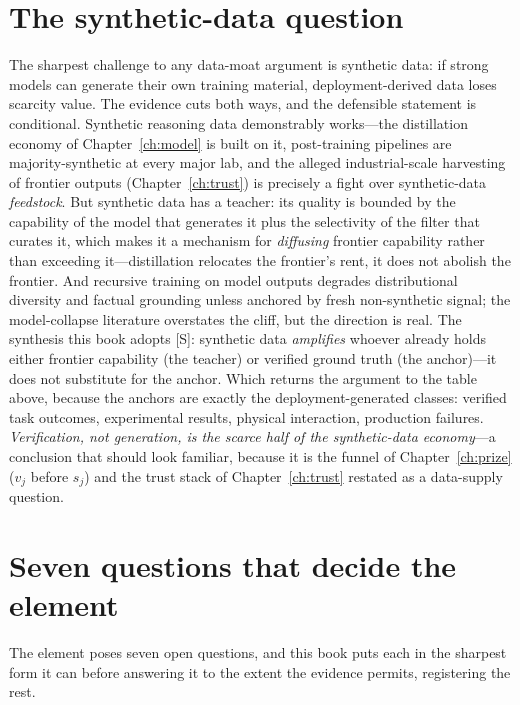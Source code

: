 \section{The synthetic-data question}
\label{sec:synthetic}

The sharpest challenge to any data-moat argument is synthetic data: if strong models can generate their own training material, deployment-derived data loses scarcity value. The evidence cuts both ways, and the defensible statement is conditional. Synthetic reasoning data demonstrably works---the distillation economy of Chapter~\ref{ch:model} is built on it, post-training pipelines are majority-synthetic at every major lab, and the alleged industrial-scale harvesting of frontier outputs (Chapter~\ref{ch:trust}) is precisely a fight over synthetic-data \emph{feedstock}. But synthetic data has a teacher: its quality is bounded by the capability of the model that generates it plus the selectivity of the filter that curates it, which makes it a mechanism for \emph{diffusing} frontier capability rather than exceeding it---distillation relocates the frontier's rent, it does not abolish the frontier. And recursive training on model outputs degrades distributional diversity and factual grounding unless anchored by fresh non-synthetic signal; the model-collapse literature overstates the cliff, but the direction is real. The synthesis this book adopts [S]: synthetic data \emph{amplifies} whoever already holds either frontier capability (the teacher) or verified ground truth (the anchor)---it does not substitute for the anchor. Which returns the argument to the table above, because the anchors are exactly the deployment-generated classes: verified task outcomes, experimental results, physical interaction, production failures. \emph{Verification, not generation, is the scarce half of the synthetic-data economy}---a conclusion that should look familiar, because it is the funnel of Chapter~\ref{ch:prize} ($v_j$ before $s_j$) and the trust stack of Chapter~\ref{ch:trust} restated as a data-supply question.

\section{Seven questions that decide the element}
\label{sec:data-questions}

The element poses seven open questions, and this book puts each in the sharpest form it can before answering it to the extent the evidence permits, registering the rest.


